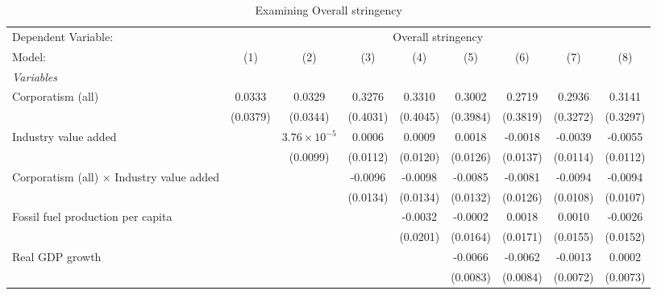 
\begin{table}[htbp]
   \caption{Examining Overall stringency}
   \centering
   \begin{tabular}{lcccccccc}
      \tabularnewline \midrule \midrule
      Dependent Variable: & \multicolumn{8}{c}{Overall stringency}\\
      Model:                                           & (1)      & (2)                   & (3)      & (4)      & (5)      & (6)      & (7)      & (8)\\  
      \midrule
      \emph{Variables}\\
      Corporatism (all)                                & 0.0333   & 0.0329                & 0.3276   & 0.3310   & 0.3002   & 0.2719   & 0.2936   & 0.3141\\   
                                                       & (0.0379) & (0.0344)              & (0.4031) & (0.4045) & (0.3984) & (0.3819) & (0.3272) & (0.3297)\\   
      Industry value added                             &          & $3.76\times 10^{-5}$  & 0.0006   & 0.0009   & 0.0018   & -0.0018  & -0.0039  & -0.0055\\   
                                                       &          & (0.0099)              & (0.0112) & (0.0120) & (0.0126) & (0.0137) & (0.0114) & (0.0112)\\   
      Corporatism (all) $\times$ Industry value added  &          &                       & -0.0096  & -0.0098  & -0.0085  & -0.0081  & -0.0094  & -0.0094\\   
                                                       &          &                       & (0.0134) & (0.0134) & (0.0132) & (0.0126) & (0.0108) & (0.0107)\\   
      Fossil fuel production per capita                &          &                       &          & -0.0032  & -0.0002  & 0.0018   & 0.0010   & -0.0026\\   
                                                       &          &                       &          & (0.0201) & (0.0164) & (0.0171) & (0.0155) & (0.0152)\\   
      Real GDP growth                                  &          &                       &          &          & -0.0066  & -0.0062  & -0.0013  & 0.0002\\   
                                                       &          &                       &          &          & (0.0083) & (0.0084) & (0.0072) & (0.0073)\\   

\end{tabular}
\end{table}
